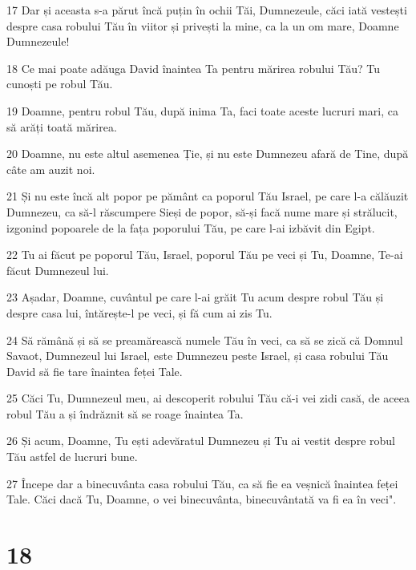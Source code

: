 \par 17 Dar și aceasta s-a părut încă puțin în ochii Tăi, Dumnezeule, căci iată vestești despre casa robului Tău în viitor și privești la mine, ca la un om mare, Doamne Dumnezeule!
\par 18 Ce mai poate adăuga David înaintea Ta pentru mărirea robului Tău? Tu cunoști pe robul Tău.
\par 19 Doamne, pentru robul Tău, după inima Ta, faci toate aceste lucruri mari, ca să arăți toată mărirea.
\par 20 Doamne, nu este altul asemenea Ție, și nu este Dumnezeu afară de Tine, după câte am auzit noi.
\par 21 Și nu este încă alt popor pe pământ ca poporul Tău Israel, pe care l-a călăuzit Dumnezeu, ca să-l răscumpere Sieși de popor, să-și facă nume mare și strălucit, izgonind popoarele de la fața poporului Tău, pe care l-ai izbăvit din Egipt.
\par 22 Tu ai făcut pe poporul Tău, Israel, poporul Tău pe veci și Tu, Doamne, Te-ai făcut Dumnezeul lui.
\par 23 Așadar, Doamne, cuvântul pe care l-ai grăit Tu acum despre robul Tău și despre casa lui, întărește-l pe veci, și fă cum ai zis Tu.
\par 24 Să rămână și să se preamărească numele Tău în veci, ca să se zică că Domnul Savaot, Dumnezeul lui Israel, este Dumnezeu peste Israel, și casa robului Tău David să fie tare înaintea feței Tale.
\par 25 Căci Tu, Dumnezeul meu, ai descoperit robului Tău că-i vei zidi casă, de aceea robul Tău a și îndrăznit să se roage înaintea Ta.
\par 26 Și acum, Doamne, Tu ești adevăratul Dumnezeu și Tu ai vestit despre robul Tău astfel de lucruri bune.
\par 27 Începe dar a binecuvânta casa robului Tău, ca să fie ea veșnică înaintea feței Tale. Căci dacă Tu, Doamne, o vei binecuvânta, binecuvântată va fi ea în veci".

\chapter{18}

